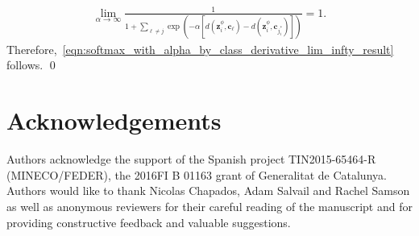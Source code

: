 \documentclass{article}
\renewcommand{\vec}[1]{\mathbf{#1}}
\newcommand{\metric}{d}
\begin{document}
\begin{align} 
\lim_{\alpha \to \infty} \frac{1}{1 + \sum_{\ell \neq j}  \exp(-\alpha [\metric(\vec{z}_i^{\phi}, \vec{c}_\ell) - \metric(\vec{z}_i^{\phi}, \vec{c}_{j_{i}^*})])} = 1. \nonumber
\end{align}
Therefore,~\eqref{eqn:softmax_with_alpha_by_class_derivative_lim_infty_result} follows. \qed

\section*{Acknowledgements}
Authors acknowledge the support of the Spanish project TIN2015-65464-R (MINECO/FEDER), the 2016FI B 01163 grant of Generalitat de Catalunya. Authors would like to thank Nicolas Chapados, Adam Salvail and Rachel Samson as well as anonymous reviewers for their careful reading of the manuscript and for providing constructive feedback and valuable suggestions.
\end{document}
